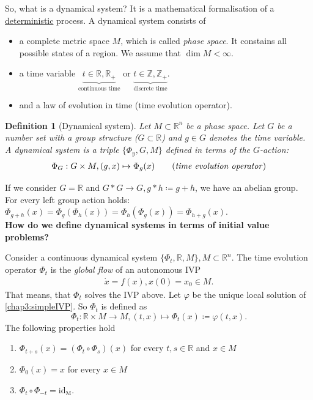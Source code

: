 \documentclass[hidelinks,a4paper, 11pt]{article}
\theoremstyle{plain}
\theoremstyle{break}
\theoremstyle{plain}
\newtheorem{definition}[theorem]{Definition}
\theoremstyle{definition}
\begin{document}
So, what is a dynamical system? It is a mathematical formalisation of a \underline{deterministic} process. A dynamical system consists of 
\begin{itemize}
	\item a complete metric space $M$, which is called \emph{phase space}. It constains all possible states of a region. We assume that $\dim M < \infty$.
	
	\item a time variable $\underbrace{t \in \mathbb R, \mathbb R_+}_{\text{continuous time}}$  or $\underbrace{t \in \mathbb Z, \mathbb Z_+}_{\text{discrete time}}$.
	
	\item and a law of evolution in time (time evolution operator).
\end{itemize}

\begin{definition}[Dynamical system]
	Let $M \subset \mathbb R^n$ be a phase space. Let $G$ be a number set with a group structure ($G \subset \mathbb R$) and $g \in G$ denotes the time variable. A \emph{dynamical system} is a triple $\{ \Phi_y, G,M \}$ defined in terms of the $G$-action:
	\begin{align*}
	\Phi_G : G \times M, (g,x) \mapsto \Phi_g(x) \tag{\textit{time evolution operator}}
	\end{align*}
\end{definition}
If we consider $G = \mathbb R$ and $G * G \to G, g *h \coloneqq g + h$, we have an abelian group. For every left group action holds: $\Phi_{g+h}(x) = \Phi_g(\Phi_h(x)) = \Phi_h(\Phi_g(x)) = \Phi_{h+g}(x)$.\\

\textbf{How do we define dynamical systems in terms of initial value problems?}

Consider a continuous dynamical system $\{ \Phi_t, \mathbb R, M \}, M \subset \mathbb R^n$.  The time evolution operator $\Phi_t$ is the \emph{global flow} of an autonomous IVP
	\begin{align}\label{chap3:simpleIVP}
		\dot x = f(x), x(0) = x_0 \in M.
	\end{align}
	That means, that $\Phi_t$ solves the IVP above. Let $\varphi$ be the unique local solution of \eqref{chap3:simpleIVP}. So $\Phi_t$ is defined as
	\[
		\Phi_t: \mathbb R \times M \to M, (t,x) \mapsto \Phi_t(x) \coloneqq \varphi(t,x).
	\]
The following properties hold
\begin{enumerate}
	\item $\Phi_{t+s}(x) = (\Phi_t \circ \Phi_s)(x)$ for every $t,s \in \mathbb R$ and $x \in M$
	\begin{center}
	\end{center}

	
	\item $\Phi_0(x) = x$ for every $x \in M$
	
	\item $\Phi_t \circ \Phi_{-t} = \mathrm{id_M}$.
\end{enumerate}
\end{document}
